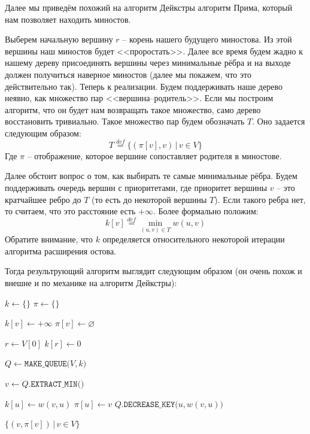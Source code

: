 
Далее мы приведём похожий на алгоритм Дейкстры алгоритм Прима, который нам позволяет находить миностов.

Выберем начальную вершину $r$ -- корень нашего будущего миностова. Из этой вершины наш миностов будет <<проростать>>.
Далее все время будем жадно к нашему дереву присоединять вершины через минимальные рёбра и на выходе должен получиться наверное миностов (далее мы покажем, что это действительно так). Теперь к реализации.
Будем поддерживать наше дерево неявно, как множество пар <<вершина--родитель>>. 
Если мы построим алгоритм, что он будет нам возвращать такое множество, само дерево восстановить тривиально. Такое множество пар будем обозначать $T$.
Оно задается следующим образом:
\begin{equation*}
    T \overset{def}{=} \{ (\pi[v], v) \, | \, v \in V \}
\end{equation*}
Где $\pi$ -- отображение, которое вершине сопоставляет родителя в миностове.

Далее обстоит вопрос о том, как выбирать те самые минимальные рёбра. Будем поддерживать очередь вершин с приоритетами, где приоритет вершины $v$ -- это кратчайшее ребро до $T$ (то есть до некоторой вершины $T$).
Если такого ребра нет, то считаем, что это расстояние есть $+\infty$. Более формально положим:
\begin{equation*}
    k[v] \overset{def}{=} \min\limits_{(u, v) \in T} w(u, v)
\end{equation*}
Обратите внимание, что $k$ определяется относительного некоторой итерации алгоритма расширения остова.

Тогда результрующий алгоритм выглядит следующим образом (он очень похож и внешне и по механике на алгоритм Дейкстры):

\begin{algorithm}[H]
\caption{Алгоритм Прима}
\begin{algorithmic}[1]

    \State $k \gets \{\}$
    \State $\pi \gets \{\}$

        \State $k[v] \gets +\infty$
        \State $\pi[v] \gets \varnothing$
    \EndFor

    \State $r \gets V[0]$
    \State $k[r] \gets 0$ 

    \State $Q \gets \texttt{MAKE\_QUEUE(}V, k\texttt{)}$ 

        \State $v \gets Q\texttt{.EXTRACT\_MIN()}$

                \State $k[u] \gets w(v, u)$
                \State $\pi[u] \gets v$ 
                \State $Q\texttt{.DECREASE\_KEY(}u, w(v, u)\texttt{)}$
            \EndIf
        \EndFor
    \EndWhile

    \State \Return $\{ (v, \pi[v]) \, | \, v \in V \}$
\EndFunction
\end{algorithmic}
\end{algorithm}

